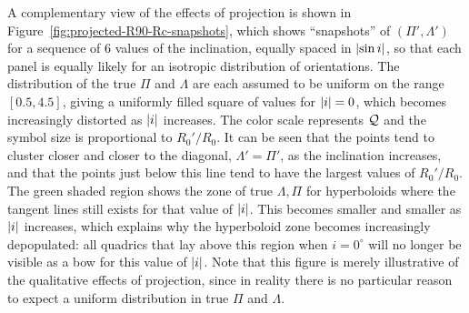 A complementary view of the effects of projection is shown in
Figure~\ref{fig:projected-R90-Rc-snapshots}, which shows ``snapshots''
of \((\Pi', \Lambda')\) for a sequence of 6 values of the inclination, equally
spaced in \(\lvert\sin {i}\rvert\), so that each panel is equally likely for
an isotropic distribution of orientations.  The distribution of the
true \(\Pi\) and \(\Lambda\) are each assumed to be uniform on the range
\([0.5, 4.5]\), giving a uniformly filled square of values for
\(\lvert i\rvert = 0\), which becomes increasingly distorted as \(\lvert i\rvert\)
increases.  The color scale represents \(\mathcal{Q}\) and the symbol size is
proportional to \(R_0'/R_0\).  It can be seen that the points tend to
cluster closer and closer to the diagonal, \(\Lambda' = \Pi'\), as the
inclination increases, and that the points just below this line tend
to have the largest values of \(R_0'/R_0\).  The green shaded region
shows the zone of true \(\Lambda, \Pi\) for hyperboloids where the tangent
lines still exists for that value of \(\lvert i\rvert\).  This becomes
smaller and smaller as \(\lvert i\rvert\) increases, which explains why the
hyperboloid zone becomes increasingly depopulated: all quadrics that
lay above this region when \(i = 0^\circ\) will no longer be visible as a
bow for this value of \(\lvert i\rvert\).  Note that this figure is merely
illustrative of the qualitative effects of projection, since in
reality there is no particular reason to expect a uniform distribution
in true \(\Pi\) and \(\Lambda\).







 

